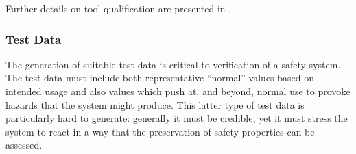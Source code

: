 

Further details on tool qualification are presented in .

\subsubsection{Test Data}
The generation of suitable test data is critical to verification of a safety system. The test data must include both representative ``normal'' values based on intended usage and also values which push at, and beyond, normal use to provoke hazards that the system might produce. This latter type of test data is particularly hard to generate: generally it must be credible, yet it must stress the system to react in a way that the preservation of safety properties can be assessed. 

